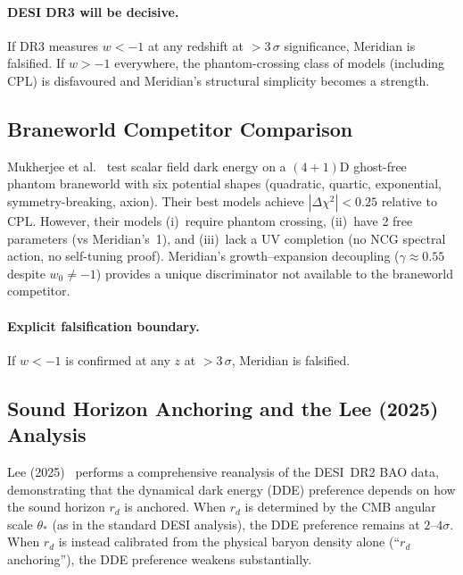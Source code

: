 \paragraph{DESI DR3 will be decisive.} If DR3 measures $w < -1$ at any redshift at $> 3\,\sigma$ significance, Meridian is falsified. If $w > -1$ everywhere, the phantom-crossing class of models (including CPL) is disfavoured and Meridian's structural simplicity becomes a strength.

\subsection{Braneworld Competitor Comparison}
\label{sec:2-DESI-braneworld}

Mukherjee et al.~\cite{ch2:mukherjee25} test scalar field dark energy on a $(4{+}1)$D ghost-free phantom braneworld with six potential shapes (quadratic, quartic, exponential, symmetry-breaking, axion). Their best models achieve $|\Delta\chi^2| < 0.25$ relative to CPL. However, their models (i)~require phantom crossing, (ii)~have 2 free parameters (vs Meridian's~1), and (iii)~lack a UV completion (no NCG spectral action, no self-tuning proof). Meridian's growth--expansion decoupling ($\gamma \approx 0.55$ despite $w_0 \neq -1$) provides a unique discriminator not available to the braneworld competitor.

\paragraph{Explicit falsification boundary.}
If $w < -1$ is confirmed at any $z$ at $> 3\,\sigma$, Meridian is falsified.

\subsection{Sound Horizon Anchoring and the Lee (2025) Analysis}
\label{sec:2-lee2025-rd}

Lee (2025)~\cite{ch2:Lee2025} performs a comprehensive reanalysis of the DESI~DR2 BAO data, demonstrating that the dynamical dark energy (DDE) preference depends on how the sound horizon $r_d$ is anchored. When $r_d$ is determined by the CMB angular scale $\theta_*$ (as in the standard DESI analysis), the DDE preference remains at $2$--$4\sigma$. When $r_d$ is instead calibrated from the physical baryon density alone (``$r_d$ anchoring''), the DDE preference weakens substantially.

